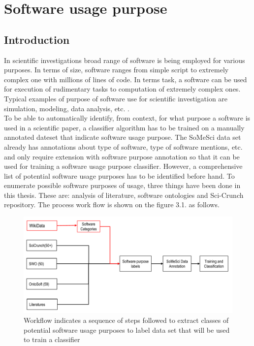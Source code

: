 \chapter{Software usage purpose }
\label{ch:purpose}
 

%
%
\section{Introduction}
\label{sec:purpose:intro}

In scientific investigations broad range of software is being employed for various purposes. In terms of size, software ranges from simple script to extremely complex one with millions of lines of code. In terms task, a software can be used for execution of rudimentary tasks to computation of extremely complex ones. Typical examples of purpose of software use for scientific investigation are simulation, modeling, data analysis, etc. \citep{goble2014better}. \\


To be able to automatically identify, from context, for what purpose a software is used in a scientific paper, a classifier algorithm has to be trained on a manually annotated dateset that indicate software usage purpose. The \ac{SoMeSci} data set already has annotations about type of software, type of software mentions, etc. and only require extension with software purpose annotation so that it can be used for training a software usage purpose classifier. However, a comprehensive list of potential software usage purposes has to be identified before hand. To enumerate possible software purposes of usage, three things have been done in this thesis. These are:
analysis of literature,  software ontologies and Sci-Crunch repository. The process work flow is shown on the figure 3.1. as follows.  

\begin{figure}[htbp]
	\centering
	\includegraphics[width=1\textwidth]{4.graphics/figures/softwarePurposeprocess}
	\caption{Workflow indicates a sequence of steps followed to extract classes of potential software usage purposes to label data set that will be used to train a classifier }
	\label{fig:chapter03:setup}
\end{figure}



